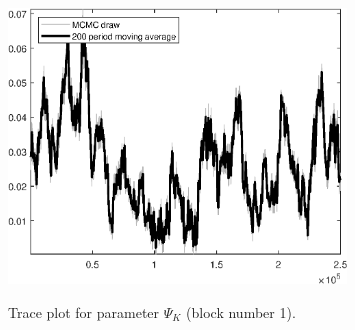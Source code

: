 \begin{figure}[H]
\centering
  \includegraphics[width=0.8\textwidth]{BRS_growth_ext_util/graphs/TracePlot_Psi_K_blck_1}\\
    \caption{Trace plot for parameter ${\Psi_K}$ (block number 1).}
\end{figure}
